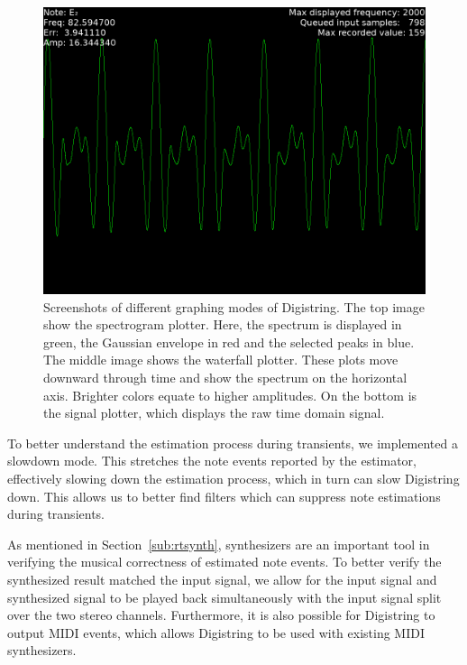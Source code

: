 \documentclass[a4paper,10pt,twocolumn]{article}
\begin{document}
\begin{figure}[h]
        \includegraphics[width=\linewidth]{fig/digi_wave.png}
    \caption{Screenshots of different graphing modes of Digistring. The top image show the spectrogram plotter. Here, the spectrum is displayed in green, the Gaussian envelope in red and the selected peaks in blue. The middle image shows the waterfall plotter. These plots move downward through time and show the spectrum on the horizontal axis. Brighter colors equate to higher amplitudes. On the bottom is the signal plotter, which displays the raw time domain signal.}
    \label{fig:screens}
\end{figure}

To better understand the estimation process during transients, we implemented a slowdown mode. This stretches the note events reported by the estimator, effectively slowing down the estimation process, which in turn can slow Digistring down. This allows us to better find filters which can suppress note estimations during transients.

As mentioned in Section~\ref{sub:rtsynth}, synthesizers are an important tool in verifying the musical correctness of estimated note events. To better verify the synthesized result matched the input signal, we allow for the input signal and synthesized signal to be played back simultaneously with the input signal split over the two stereo channels. Furthermore, it is also possible for Digistring to output MIDI events, which allows Digistring to be used with existing MIDI synthesizers.
\end{document}
